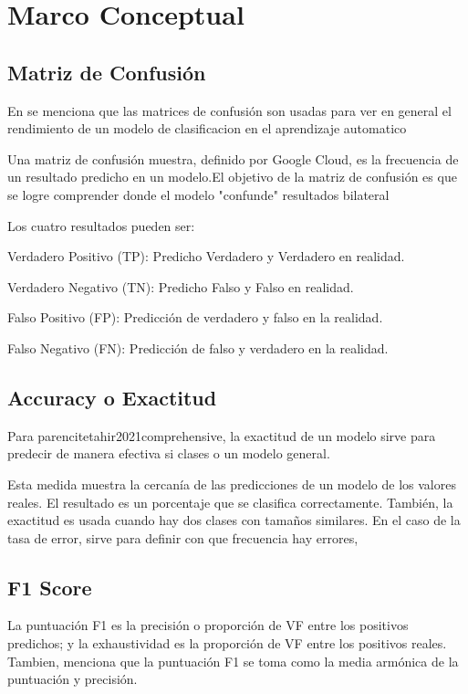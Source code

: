 \section{Marco Conceptual}

\subsection{Matriz de Confusión}

En \parencite{tahir2021comprehensive} se menciona que las matrices de confusión son usadas para ver en general el rendimiento de un modelo de clasificacion en el aprendizaje automatico

Una matriz de confusión muestra, definido por Google Cloud, es la frecuencia de un resultado predicho en un modelo.El objetivo de la matriz de confusión es que se logre comprender donde el modelo "confunde" resultados bilateral 

Los cuatro resultados pueden ser:

Verdadero Positivo (TP): Predicho Verdadero y Verdadero en realidad.
\thinspace

Verdadero Negativo (TN): Predicho Falso y Falso en realidad.
\thinspace

Falso Positivo (FP): Predicción de verdadero y falso en la realidad.
\thinspace

Falso Negativo (FN): Predicción de falso y verdadero en la realidad.

\subsection{Accuracy o Exactitud}

Para \cite{tahir2021comprehensive} parencite{tahir2021comprehensive}, la exactitud de un modelo sirve para predecir de manera efectiva si clases o un modelo general.

Esta medida muestra la cercanía de las predicciones de un modelo de los valores reales. El resultado es un porcentaje que se clasifica correctamente. También, la exactitud es usada cuando hay dos clases con tamaños similares. En el caso de la tasa de error, sirve para definir con que frecuencia hay errores, \cite{datasour} 

\subsection{F1 Score}

La puntuación F1 es la precisión o proporción de VF entre los positivos predichos; y la exhaustividad es la proporción de VF entre los positivos reales. Tambien, \cite{tahir2021comprehensive} menciona que la puntuación F1 se toma como la media armónica de la puntuación y precisión.



